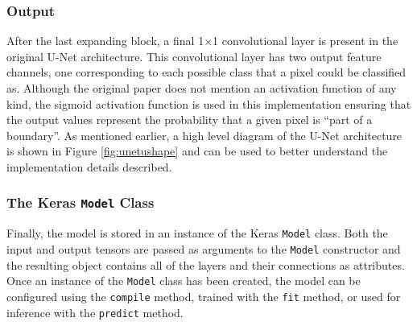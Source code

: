\subsubsection{Output}

After the last expanding block, a final 1$\times$1 convolutional layer is present in the original U-Net architecture. This convolutional layer has two output feature channels, one corresponding to each possible class that a pixel could be classified as. Although the original paper does not mention an activation function of any kind, the sigmoid activation function is used in this implementation ensuring that the output values represent the probability that a given pixel is ``part of a boundary''. As mentioned earlier, a high level diagram of the U-Net architecture is shown in Figure \ref{fig:unetushape} and can be used to better understand the implementation details described.

\subsubsection{The Keras \texttt{Model} Class}

Finally, the model is stored in an instance of the Keras \texttt{Model} class. Both the input and output tensors are passed as arguments to the \texttt{Model} constructor and the resulting object contains all of the layers and their connections as attributes. Once an instance of the \texttt{Model} class has been created, the model can be configured using the \texttt{compile} method, trained with the \texttt{fit} method, or used for inference with the \texttt{predict} method.

